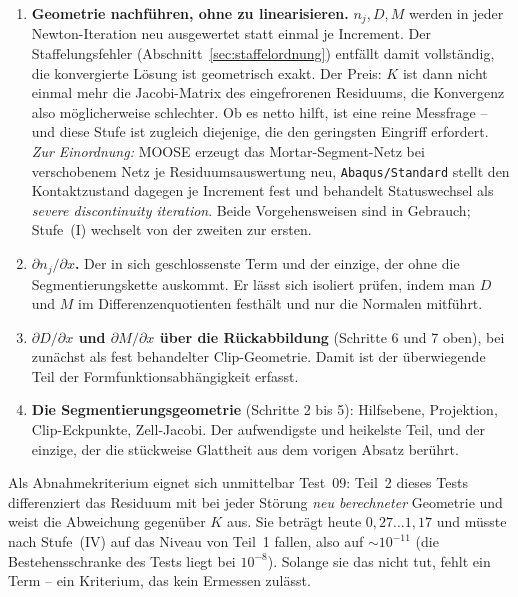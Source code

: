 \documentclass[a4paper,11pt]{article}
\def\bm#1{#1}%
\newcommand{\code}[1]{\texttt{\small #1}}
\begin{document}
\begin{enumerate}\itemsep3pt
  \item[\textbf{(I)}] \textbf{Geometrie nachführen, ohne zu linearisieren.} $\bm n_j,\bm D,\bm M$
        werden in jeder Newton-Iteration neu ausgewertet statt einmal je Increment. Der
        Staffelungsfehler (Abschnitt~\ref{sec:staffelordnung}) entfällt damit vollständig, die
        konvergierte Lösung ist geometrisch exakt. Der Preis: $\bm K$ ist dann nicht einmal mehr
        die Jacobi-Matrix des eingefrorenen Residuums, die Konvergenz also möglicherweise
        schlechter. Ob es netto hilft, ist eine reine Messfrage -- und diese Stufe ist zugleich
        diejenige, die den geringsten Eingriff erfordert. \emph{Zur Einordnung:} MOOSE erzeugt das
        Mortar-Segment-Netz bei verschobenem Netz je Residuumsauswertung neu, \code{Abaqus/Standard}
        stellt den Kontaktzustand dagegen je Increment fest und behandelt Statuswechsel als
        \emph{severe discontinuity iteration}. Beide Vorgehensweisen sind in Gebrauch; Stufe~(I)
        wechselt von der zweiten zur ersten.
  \item[\textbf{(II)}] \textbf{$\partial\bm n_j/\partial\bm x$.} Der in sich geschlossenste Term
        und der einzige, der ohne die Segmentierungskette auskommt. Er lässt sich isoliert
        prüfen, indem man $\bm D$ und $\bm M$ im Differenzenquotienten festhält und nur die
        Normalen mitführt.
  \item[\textbf{(III)}] \textbf{$\partial\bm D/\partial\bm x$ und $\partial\bm M/\partial\bm x$
        über die Rückabbildung} (Schritte 6 und 7 oben), bei zunächst als fest behandelter
        Clip-Geometrie. Damit ist der überwiegende Teil der Formfunktionsabhängigkeit erfasst.
  \item[\textbf{(IV)}] \textbf{Die Segmentierungsgeometrie} (Schritte 2 bis 5): Hilfsebene,
        Projektion, Clip-Eckpunkte, Zell-Jacobi. Der aufwendigste und heikelste Teil, und der
        einzige, der die stückweise Glattheit aus dem vorigen Absatz berührt.
\end{enumerate}

\noindent Als Abnahmekriterium eignet sich unmittelbar Test~09: Teil~2 dieses Tests differenziert
das Residuum mit bei jeder Störung \emph{neu berechneter} Geometrie und weist die Abweichung
gegenüber $\bm K$ aus. Sie beträgt heute $0{,}27\ldots1{,}17$ und müsste nach Stufe~(IV) auf das
Niveau von Teil~1 fallen, also auf $\sim\!10^{-11}$ (die Bestehensschranke des Tests liegt bei
$10^{-8}$). Solange sie das nicht tut, fehlt ein Term --
ein Kriterium, das kein Ermessen zulässt.
\end{document}
